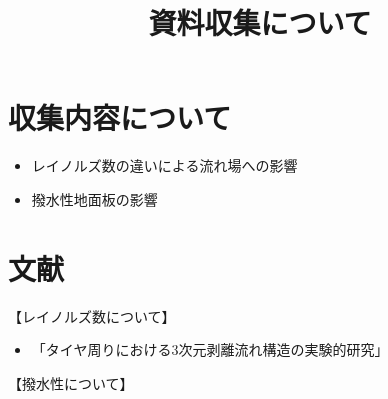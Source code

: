 \documentclass[twocolumn,a4j]{jsarticle}
\author{}
\title{資料収集について}
\date{}
\begin{document}
\columnseprule=0.1mm
\maketitle
\section{\large 収集内容について}
\begin{itemize}
    \item レイノルズ数の違いによる流れ場への影響
    \item 撥水性地面板の影響
\end{itemize}
\section{\large 文献}
【レイノルズ数について】
\begin{itemize}
    \item 「タイヤ周りにおける3次元剥離流れ構造の実験的研究」
\end{itemize}
【撥水性について】\\
\end{document}
